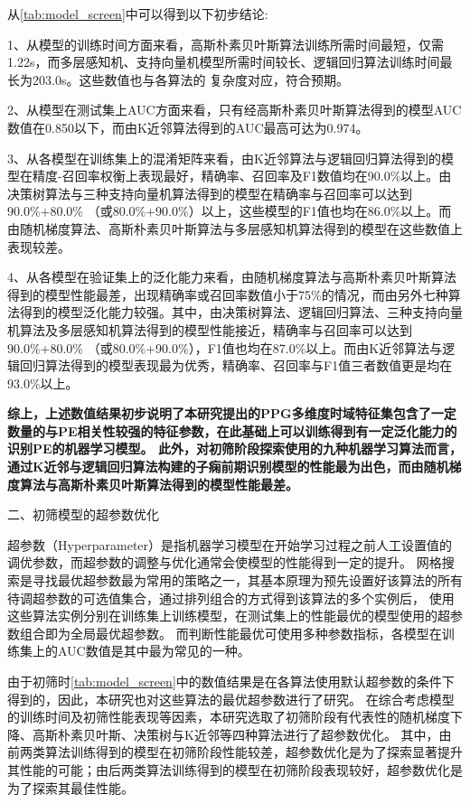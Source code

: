 从\autoref{tab:model_screen}中可以得到以下初步结论:

1、从模型的训练时间方面来看，高斯朴素贝叶斯算法训练所需时间最短，仅需1.22s，而多层感知机、支持向量机模型所需时间较长、逻辑回归算法训练时间最长为203.0s。这些数值也与各算法的
复杂度对应，符合预期。

2、从模型在测试集上AUC方面来看，只有经高斯朴素贝叶斯算法得到的模型AUC数值在0.850以下，而由K近邻算法得到的AUC最高可达为0.974。

3、从各模型在训练集上的混淆矩阵来看，由K近邻算法与逻辑回归算法得到的模型在精度-召回率权衡上表现最好，精确率、召回率及F1数值均在90.0\%以上。由决策树算法与三种支持向量机算法得到的模型在精确率与召回率可以达到90.0\%+80.0\%
（或80.0\%+90.0\%）以上，这些模型的F1值也均在86.0\%以上。而由随机梯度算法、高斯朴素贝叶斯算法与多层感知机算法得到的模型在这些数值上表现较差。

4、从各模型在验证集上的泛化能力来看，由随机梯度算法与高斯朴素贝叶斯算法得到的模型性能最差，出现精确率或召回率数值小于75\%的情况，而由另外七种算法得到的模型泛化能力较强。其中，由决策树算法、逻辑回归算法、三种支持向量机算法及多层感知机算法得到的模型性能接近，精确率与召回率可以达到90.0\%+80.0\%
（或80.0\%+90.0\%），F1值也均在87.0\%以上。而由K近邻算法与逻辑回归算法得到的模型表现最为优秀，精确率、召回率与F1值三者数值更是均在93.0\%以上。

\textbf{综上，上述数值结果初步说明了本研究提出的PPG多维度时域特征集包含了一定数量的与PE相关性较强的特征参数，在此基础上可以训练得到有一定泛化能力的识别PE的机器学习模型。
此外，对初筛阶段探索使用的九种机器学习算法而言，通过K近邻与逻辑回归算法构建的子痫前期识别模型的性能最为出色，而由随机梯度算法与高斯朴素贝叶斯算法得到的模型性能最差。}

二、初筛模型的超参数优化

超参数（Hyperparameter）是指机器学习模型在开始学习过程之前人工设置值的调优参数\cite{scikit-learn,Aurélien2018}，而超参数的调整与优化通常会使模型的性能得到一定的提升。
网格搜索是寻找最优超参数最为常用的策略之一，其基本原理为预先设置好该算法的所有待调超参数的可选值集合，通过排列组合的方式得到该算法的多个实例后，
使用这些算法实例分别在训练集上训练模型，在测试集上的性能最优的模型使用的超参数组合即为全局最优超参数\cite{Aurélien2018}。
而判断性能最优可使用多种参数指标，各模型在训练集上的AUC数值是其中最为常见的一种。

由于初筛时\autoref{tab:model_screen}中的数值结果是在各算法使用默认超参数的条件下得到的，因此，本研究也对这些算法的最优超参数进行了研究。
在综合考虑模型的训练时间及初筛性能表现等因素，本研究选取了初筛阶段有代表性的随机梯度下降、高斯朴素贝叶斯、决策树与K近邻等四种算法进行了超参数优化。
其中，由前两类算法训练得到的模型在初筛阶段性能较差，超参数优化是为了探索显著提升其性能的可能；由后两类算法训练得到的模型在初筛阶段表现较好，超参数优化是为了探索其最佳性能。

